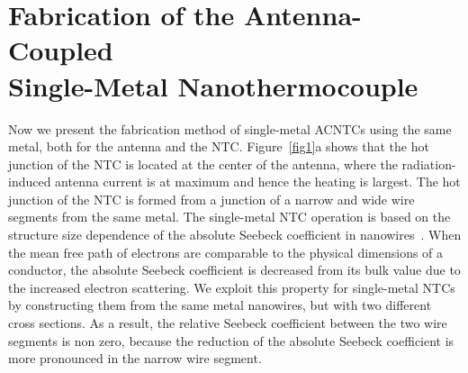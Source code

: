 \documentclass[journal]{IEEEtran}
\begin{document}
\section{Fabrication of the Antenna-Coupled \\ Single-Metal Nanothermocouple}\label{Fabrication}
%
%
Now we present the fabrication method of single-metal ACNTCs using the same metal, both for the antenna and the NTC. Figure~\ref{fig1}a shows that the hot junction of the NTC is located at the center of the antenna, where the radiation-induced antenna current is at maximum and hence the heating is largest. The hot junction of the NTC is formed from a junction of a narrow and wide wire segments from the same metal. The single-metal NTC operation is based on the structure size dependence of the absolute Seebeck coefficient in nanowires~\cite{szakmany_single-metal_2014}. When the mean free path of electrons are comparable to the physical dimensions of a conductor, the absolute Seebeck coefficient is decreased from its bulk value due to the increased electron scattering. We exploit this property for single-metal NTCs by constructing them from the same metal nanowires, but with two different cross sections. As a result, the relative Seebeck coefficient between the two wire segments is non zero, because the reduction of the absolute Seebeck coefficient is more pronounced in the narrow wire segment.
\end{document}
